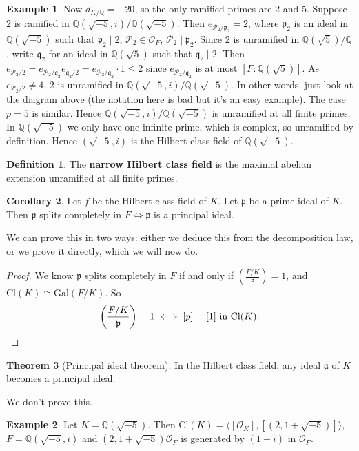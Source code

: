 \documentclass{article}
\theoremstyle{definition}
\newtheorem{theorem}{Theorem}[section]
\newtheorem{cor}[theorem]{Corollary}
\newtheorem{example}{Example}[section]
\newtheorem{defn}[theorem]{Definition}
\begin{document}
\begin{example}
    Now $d_{K/\mathbb{Q}} = -20$, so the only ramified primes are 2 and 5. Suppose $2$ is ramified in $\mathbb{Q}(\sqrt{-5},i)/\mathbb{Q}(\sqrt{-5})$. Then $e_{\mathcal{P}_2/\mathfrak{p}_2}=2$, where $\mathfrak{p}_2$ is an ideal in $\mathbb{Q}(\sqrt{-5})$ such that $\mathfrak{p}_2 \mid 2$, $\mathcal{P}_2 \in \mathcal{O}_F$, $\mathcal{P}_2 \mid \mathfrak{p}_2$. Since 2 is unramified in $\mathbb{Q}(\sqrt{5})/\mathbb{Q}$, write $\mathfrak{q}_2$ for an ideal in $\mathbb{Q}(\sqrt{5})$ such that $\mathfrak{q}_2 \mid 2$. Then $e_{\mathcal{P}_2/2} = e_{\mathcal{P}_2/\mathfrak{q}_2}e_{\mathfrak{q_2}/2} = e_{\mathcal{P}_2/\mathfrak{q}_2}\cdot 1\le 2$ since $e_{\mathcal{P}_2/\mathfrak{q}_2}$ is at most $[F:\mathbb{Q}(\sqrt{5})]$. As $e_{\mathcal{P}_2/2} \neq 4$, 2 is unramified in $\mathbb{Q}(\sqrt{-5},i)/\mathbb{Q}(\sqrt{-5})$. In other words, just look at the diagram above (the notation here is bad but it's an easy example). The case $p=5$ is similar. Hence $\mathbb{Q}(\sqrt{-5},i)/\mathbb{Q}(\sqrt{-5})$ is unramified at all finite primes. In $\mathbb{Q}(\sqrt{-5})$ we only have one infinite prime, which is complex, so unramified by definition. Hence $(\sqrt{-5},i)$ is the Hilbert class field of $\mathbb{Q}(\sqrt{-5})$.
\end{example}
\begin{defn}
    The \textbf{narrow Hilbert class field} is the maximal abelian extension unramified at all finite primes.
\end{defn}
\begin{cor}
    Let $f$ be the Hilbert class field of $K$. Let $\mathfrak{p}$ be a prime ideal of $K$. Then $\mathfrak{p}$ splits completely in $F \iff \mathfrak{p}$ is a principal ideal.
\end{cor}
We can prove this in two ways: either we deduce this from the decomposition law, or we prove it directly, which we will now do.
\begin{proof}
    We know $\mathfrak{p}$ splits completely in $F$ if and only if $\left(\frac{F/K}{\mathfrak{p}}\right)=1$, and $\text{Cl}(K) \cong \text{Gal}(F/K)$. So \[
    \left(\frac{F/K}{\mathfrak{p}}\right) = 1 \iff [p]=[1] \text{ in }\text{Cl}(K).
    \qedhere\] 
\end{proof}
\begin{theorem}[Principal ideal theorem]
    In the Hilbert class field, any ideal $\mathfrak{a}$ of $K$ becomes a principal ideal.
\end{theorem}
We don't prove this.
\begin{example}
    Let $K = \mathbb{Q}(\sqrt{-5})$. Then $\text{Cl}(K) = \langle[\mathcal{O}_K], [(2,1+\sqrt{-5})]\rangle$, $F = \mathbb{Q}(\sqrt{-5},i)$ and $(2,1+\sqrt{-5})\mathcal{O}_F$ is generated by $(1+i)$ in $\mathcal{O}_F$.
\end{example}
\end{document}
